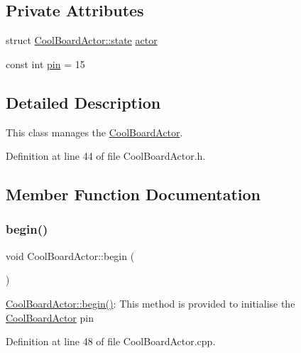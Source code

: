 \subsection*{Private Attributes}
\begin{DoxyCompactItemize}
\item 
struct \hyperlink{struct_cool_board_actor_1_1state}{Cool\+Board\+Actor\+::state} \hyperlink{class_cool_board_actor_a8f190db9f7a39fddbcef7f152da970e9}{actor}
\item 
const int \hyperlink{class_cool_board_actor_a8b5c0b41fe6033b68d9e1ed00bc2e122}{pin} = 15
\end{DoxyCompactItemize}


\subsection{Detailed Description}
This class manages the \hyperlink{class_cool_board_actor}{Cool\+Board\+Actor}. 

Definition at line 44 of file Cool\+Board\+Actor.\+h.



\subsection{Member Function Documentation}
\mbox{\label{class_cool_board_actor_a7f4422fd85a5510bc2cdfd68e109be5e}} 
\subsubsection{\texorpdfstring{begin()}{begin()}}
{\footnotesize\ttfamily void Cool\+Board\+Actor\+::begin (\begin{DoxyParamCaption}{ }\end{DoxyParamCaption})}

\hyperlink{class_cool_board_actor_a7f4422fd85a5510bc2cdfd68e109be5e}{Cool\+Board\+Actor\+::begin()}\+: This method is provided to initialise the \hyperlink{class_cool_board_actor}{Cool\+Board\+Actor} pin 

Definition at line 48 of file Cool\+Board\+Actor.\+cpp.


